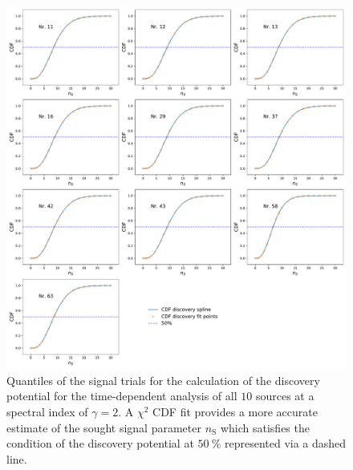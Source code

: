 \begin{figure}
    \centering
    \includegraphics[width=\linewidth]{Plots/appendix/9_years_gfu_gold_time_dep_cdf_disc.pdf}
    \caption{Quantiles of the signal trials for the calculation of the discovery potential for the time-dependent analysis of all $\num{10}$ sources at a spectral index of $\gamma=\num{2}$. A $\chi^2$ CDF fit provides a more accurate estimate of the sought signal parameter $n_\text{S}$ which satisfies the condition of the discovery potential at $\SI{50}{\percent}$ represented via a dashed line.}
    \label{fig:time_dep_cdf_disc}
\end{figure}

